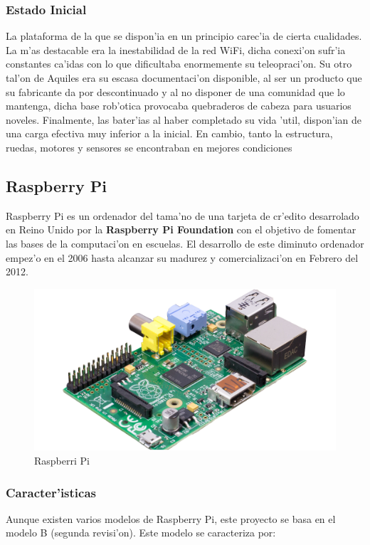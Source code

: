 \documentclass[twoside,12pt]{article}
\begin{document}
\subsubsection{Estado Inicial}  
La plataforma de la que se dispon'ia en un principio carec'ia de cierta cualidades. La m'as destacable era la inestabilidad de la red WiFi, dicha conexi'on sufr'ia constantes ca'idas con lo que dificultaba enormemente su teleopraci'on. Su otro tal'on de Aquiles era su escasa documentaci'on disponible, al ser un producto que su fabricante da por descontinuado y al no disponer de una comunidad que lo mantenga, dicha base rob'otica provocaba quebraderos de cabeza para usuarios noveles. Finalmente, las bater'ias al haber completado su vida 'util, dispon'ian de una carga efectiva muy inferior a la inicial. En cambio, tanto la estructura, ruedas, motores y sensores se encontraban en mejores condiciones\\
\newpage

\subsection{Raspberry Pi}
Raspberry Pi es un ordenador del tama'no de una tarjeta de cr'edito desarrolado en Reino Unido por la \textbf{Raspberry Pi Foundation} con el objetivo de fomentar las bases de la computaci'on en escuelas. El desarrollo de este diminuto ordenador empez'o en el 2006 hasta alcanzar su madurez y comercializaci'on en Febrero del 2012. 

\begin{figure}[ht]
\centering
\includegraphics[scale=0.2]{images/raspi.png} 
\caption{Raspberri Pi}
\label{fig:Raspberry Pi}
\end{figure}

\subsubsection{Caracter'isticas}
Aunque existen varios modelos de Raspberry Pi, este proyecto se basa en el modelo B (segunda revisi'on). Este modelo se caracteriza por:
\end{document}
